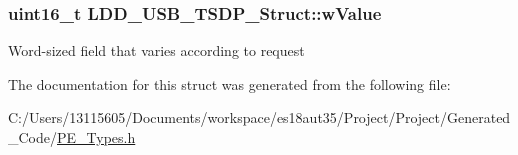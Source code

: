 \subsubsection[{w\+Value}]{\setlength{\rightskip}{0pt plus 5cm}uint16\+\_\+t L\+D\+D\+\_\+\+U\+S\+B\+\_\+\+T\+S\+D\+P\+\_\+\+Struct\+::w\+Value}\label{struct_l_d_d___u_s_b___t_s_d_p___struct_abe97822a1a8976f53da5a43b8db8cfd3}
Word-\/sized field that varies according to request 

The documentation for this struct was generated from the following file\+:\begin{DoxyCompactItemize}
\item 
C\+:/\+Users/13115605/\+Documents/workspace/es18aut35/\+Project/\+Project/\+Generated\+\_\+\+Code/\hyperlink{_p_e___types_8h}{P\+E\+\_\+\+Types.\+h}\end{DoxyCompactItemize}
